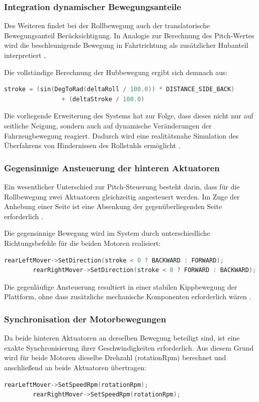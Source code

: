 \subsubsection{Integration dynamischer Bewegungsanteile}
Des Weiteren findet bei der Rollbewegung auch der translatorische Bewegungsanteil Berücksichtigung. In Analogie zur Berechnung des Pitch-Wertes wird die beschleunigende Bewegung in Fahrtrichtung als zusätzlicher Hubanteil interpretiert \cite{Slater2016}, \cite{Steuer1992}

Die vollständige Berechnung der Hubbewegung ergibt sich demnach aus:
\begin{lstlisting}[language=C++, caption={Berechnung Hubbewegung hinten}, label={lst:full_calculation_side}]
        stroke = (sin(DegToRad(deltaRoll / 100.0)) * DISTANCE_SIDE_BACK)
                + (deltaStroke / 100.0)
\end{lstlisting}
Die vorliegende Erweiterung des Systems hat zur Folge, dass dieses nicht nur auf seitliche Neigung, sondern auch auf dynamische Veränderungen der Fahrzeugbewegung reagiert. Dadurch wird eine realitätsnahe Simulation des Überfahrens von Hindernissen des Rollstuhls ermöglicht \cite{Slater2016}.

\subsubsection{Gegensinnige Ansteuerung der hinteren Aktuatoren}
Ein wesentlicher Unterschied zur Pitch-Steuerung besteht darin, dass für die Rollbewegung zwei Aktuatoren gleichzeitig angesteuert werden. Im Zuge der Anhebung einer Seite ist eine Absenkung der gegenüberliegenden Seite erforderlich \cite{Siciliano1959}.

Die gegensinnige Bewegung wird im System durch unterschiedliche Richtungsbefehle für die beiden Motoren realisiert:
\begin{lstlisting}[language=C++, caption={Gegensinnige Ansteuerung hinten}, label={lst:gegenseitige_ansteuerung_hinten}]
        rearLeftMover->SetDirection(stroke < 0 ? BACKWARD : FORWARD);
        rearRightMover->SetDirection(stroke < 0 ? FORWARD : BACKWARD);
\end{lstlisting}
Die gegenläufige Ansteuerung resultiert in einer stabilen Kippbewegung der Plattform, ohne dass zusätzliche mechanische Komponenten erforderlich wären \cite{Siciliano1959}.

\subsubsection{Synchronisation der Motorbewegungen}
Da beide hinteren Aktuatoren an derselben Bewegung beteiligt sind, ist eine exakte Synchronisierung ihrer Geschwindigkeiten erforderlich. Aus diesem Grund wird für beide Motoren dieselbe Drehzahl (rotationRpm) berechnet und anschließend an beide Aktuatoren übertragen:
\begin{lstlisting}[language=C++, caption={Synchronisierte Motorbewegung hinten}, label={lst:synchronisation_motorbewegeung}]
        rearLeftMover->SetSpeedRpm(rotationRpm);
        rearRightMover->SetSpeedRpm(rotationRpm);
\end{lstlisting}

